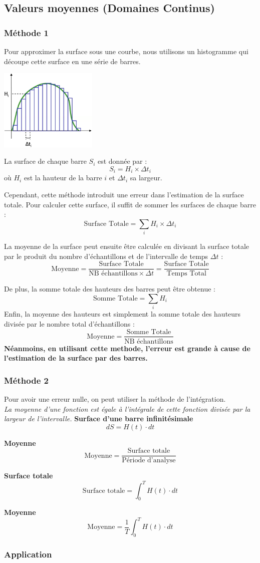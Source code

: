 \subsection{Valeurs moyennes (Domaines Continus)}
\subsubsection{Méthode 1}
Pour approximer la surface sous une courbe, nous utilisons un histogramme qui découpe cette surface en une série de barres.
\begin{center}
    \includegraphics[width=0.35\textwidth]{chapters/chapter1/images/histogramme.png}
\end{center}

La surface de chaque barre $S_i$ est donnée par :
\[
S_i = H_i \times \Delta t_i
\]
où $H_i$ est la hauteur de la barre $i$ et $\Delta t_i$ sa largeur.

Cependant, cette méthode introduit une erreur dans l'estimation de la surface totale. Pour calculer cette surface, il suffit de sommer les surfaces de chaque barre :
\[
\text{Surface Totale} = \sum_i H_i \times \Delta t_i
\]

La moyenne de la surface peut ensuite être calculée en divisant la surface totale par le produit du nombre d'échantillons et de l'intervalle de temps $\Delta t$ :
\[
\text{Moyenne} = \frac{\text{Surface Totale}}{\text{NB échantillons} \times \Delta t} = \frac{\text{Surface Totale}}{\text{Temps Total}}
\]

De plus, la somme totale des hauteurs des barres peut être obtenue :
\[
\text{Somme Totale} = \sum_i H_i
\]
Enfin, la moyenne des hauteurs est simplement la somme totale des hauteurs divisée par le nombre total d'échantillons :
\[
\text{Moyenne} = \frac{\text{Somme Totale}}{\text{NB échantillons}}
\]
\textbf{Néanmoins, en utilisant cette methode, l'erreur est grande à cause de l'estimation de la surface par des barres.}
\subsubsection{Méthode 2}
Pour avoir une erreur nulle, on peut utiliser la méthode de l'intégration. \\
\textit{La moyenne d'une fonction est égale à l'intégrale de cette fonction divisée par la largeur de l'intervalle.}
\textbf{Surface d'une barre infinitésimale} 
\[
dS = H(t) \cdot dt
\]

\textbf{Moyenne} 
\[
\text{Moyenne} = \frac{\text{Surface totale}}{\text{Période d'analyse}}
\]

\textbf{Surface totale} 
\[
\text{Surface totale} = \int_0^T H(t) \cdot dt
\]

\textbf{Moyenne} 
\[
\text{Moyenne} = \frac{1}{T} \int_0^T H(t) \cdot dt
\]
\subsubsection{Application}
